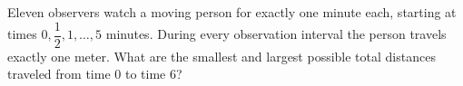 Eleven observers watch a moving person for exactly one minute each, starting at times $0,\dfrac{1}{2},1,\ldots,5$ minutes. During every observation interval the person travels exactly one meter. What are the smallest and largest possible total distances traveled from time $0$ to time $6$?
